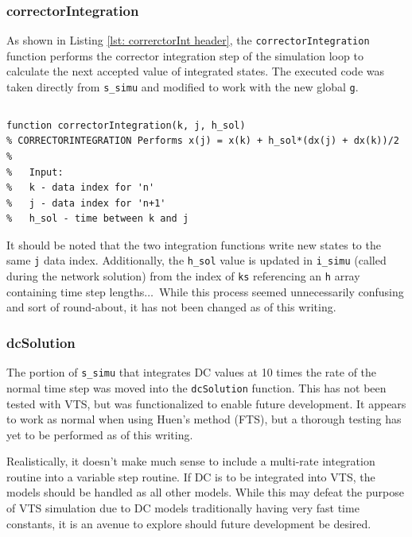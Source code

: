 \subsubsection{correctorIntegration}  
As shown in Listing \ref{lst: correrctorInt header}, the \verb|correctorIntegration| function performs the corrector integration step of the simulation loop to calculate the next accepted value of integrated states.
The executed code was taken directly from \verb|s_simu| and modified to work with the new global \verb|g|.
\pagebreak
\begin{lstlisting}[caption={Function Header for correctorIntegration},label={lst: correrctorInt header}]
\end{lstlisting}\vspace{-2 em}
\begin{verbatim}
function correctorIntegration(k, j, h_sol)
% CORRECTORINTEGRATION Performs x(j) = x(k) + h_sol*(dx(j) + dx(k))/2
%
%   Input:
%   k - data index for 'n'
%   j - data index for 'n+1'
%   h_sol - time between k and j
\end{verbatim}

It should be noted that the two integration functions write new states to the same \verb|j| data index.
Additionally, the \verb|h_sol| value is updated in \verb|i_simu| (called during the network solution) from the index of \verb|ks| referencing an \verb|h| array containing time step lengths$\ldots$\ 
While this process seemed unnecessarily confusing and sort of  round-about, it has not been changed as of this writing.

\subsubsection{dcSolution}  
The portion of \verb|s_simu| that integrates DC values at 10 times the rate of the normal time step was moved into the \verb|dcSolution| function.
This has not been tested with VTS, but was functionalized to enable future development.
It appears to work as normal when using Huen's method (FTS), but a thorough testing has yet to be performed as of this writing.

Realistically, it doesn't make much sense to include a multi-rate integration routine into a variable step routine.
If DC is to be integrated into VTS, the models should be handled as all other models.
While this may defeat the purpose of VTS simulation due to DC models traditionally having very fast time constants, it is an avenue to explore should future development be desired.

